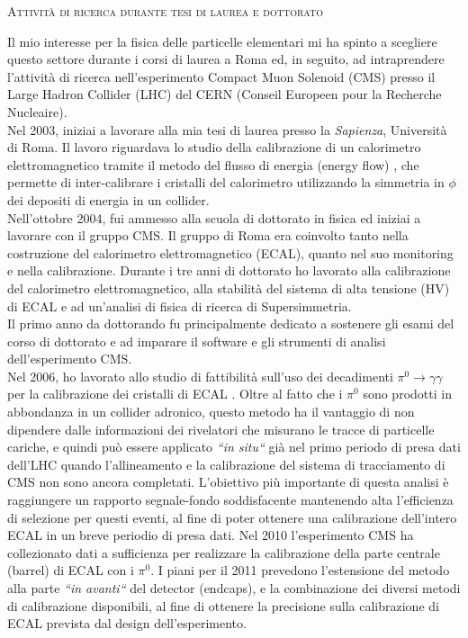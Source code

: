 \documentclass[10pt, a4paper]{article}
\begin{document}
\begin{center} \textsc{Attivit\`a di ricerca durante tesi di laurea e dottorato} \\ \end{center} 

Il mio interesse per la fisica delle particelle elementari mi ha spinto a scegliere questo settore durante 
i corsi di laurea a Roma ed, in seguito, ad intraprendere l'attivit\`a di ricerca nell'esperimento 
Compact Muon Solenoid (CMS) presso il Large Hadron Collider (LHC) del CERN
(Conseil Europeen pour la Recherche Nucleaire). \\

Nel 2003, iniziai a lavorare alla mia tesi di laurea presso la \textit{Sapienza}, Universit\`a di Roma. Il lavoro riguardava lo studio della calibrazione di un calorimetro elettromagnetico tramite il metodo del flusso di energia (energy flow) \cite{Santanastasio:LAUREA}, che permette di inter-calibrare i cristalli del calorimetro utilizzando la simmetria in $\phi$ dei depositi di energia in un collider. \\

Nell'ottobre 2004, fui ammesso alla scuola di dottorato in fisica ed iniziai a lavorare con il gruppo CMS. 
Il gruppo di Roma era coinvolto tanto nella costruzione del calorimetro elettromagnetico (ECAL), quanto nel suo 
monitoring e nella calibrazione. Durante i tre anni di dottorato ho lavorato alla calibrazione del calorimetro elettromagnetico, 
alla stabilit\`a del sistema di alta tensione (HV) di ECAL e ad un'analisi di fisica di ricerca di Supersimmetria.  \\

Il primo anno da dottorando fu principalmente dedicato a sostenere gli esami del corso di dottorato e ad imparare 
il software e gli strumenti di analisi dell'esperimento CMS. \\

Nel 2006, ho lavorato allo studio di fattibilit\`a sull'uso dei decadimenti $\pi^0 \rightarrow \gamma\gamma$ per la 
calibrazione dei cristalli di ECAL \cite{DN-2007-013,IN-2006-050}. Oltre al fatto che i $\pi^0$ sono prodotti 
in abbondanza in un collider adronico, questo metodo ha il vantaggio di non dipendere dalle informazioni dei rivelatori 
che misurano le tracce di particelle cariche, e quindi pu\`o essere applicato {\it ``in situ``} gi\`a nel primo periodo di presa dati 
dell'LHC quando l'allineamento e la calibrazione del sistema di tracciamento di CMS non sono ancora completati. 
L'obiettivo pi\`u importante di questa analisi \`e raggiungere un rapporto segnale-fondo soddisfacente mantenendo alta 
l'efficienza di selezione per questi eventi, al fine di poter ottenere una calibrazione dell'intero ECAL in un breve periodio di presa dati. 
Nel 2010 l'esperimento CMS ha collezionato dati a sufficienza per realizzare la calibrazione della parte centrale (barrel) 
di ECAL con i $\pi^0$. I piani per il 2011 prevedono l'estensione del metodo alla parte {\it ``in avanti``} del detector (endcaps), 
e la combinazione dei diversi metodi di calibrazione disponibili, al fine di ottenere la precisione sulla calibrazione di ECAL 
prevista dal design dell'esperimento. \\
\end{document}
